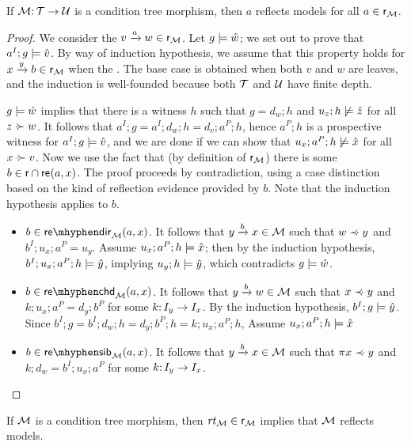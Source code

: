 \begin{lemma}\label{lem:reflection}
If ${\mathcal{M}}{:}\, {\mathcal{T}}\rightarrow {\mathcal{U}}$ is a condition tree morphism, then $a$ reflects models for all $a\in{\mathsf{r}}_{\mathcal{M}}$.
\end{lemma}
%
\begin{proof}
We consider the ${v}\xrightarrow{a}{w}\in {\mathsf{r}}_{\mathcal{M}}$. Let $g\models \hat w$; we set out to prove that $a^I;g\models \hat v$. By way of induction hypothesis, we assume that this property holds for ${x}\xrightarrow{y}{b}\in {\mathsf{r}}_{\mathcal{M}}$ when the . The base case is obtained when both $v$ and $w$ are leaves, and the induction is well-founded because both ${\mathcal{T}}$ and ${\mathcal{U}}$ have finite depth.

$g\models \hat w$ implies that there is a witness $h$ such that $g=d_w;h$ and $u_z;h\not\models \hat z$ for all $z\mathrel{\cdot\mskip-8mu\succ} w$. It follows that $a^I;g=a^I;d_w;h=d_v;a^P;h$, hence $a^P;h$ is a prospective witness for $a^I;g\models \hat v$, and we are done if we can show that $u_x;a^P;h\not\models \hat x$ for all $x\mathrel{\cdot\mskip-8mu\succ} v$. Now we use the fact that (by definition of ${\mathsf{r}}_{\mathcal{M}}$) there is some $b\in {\mathsf{r}} \cap \mathsf{re}_{}(a,x)$. The proof proceeds by contradiction, using a case distinction based on the kind of reflection evidence provided by $b$. Note that the induction hypothesis applies to $b$.
%
\begin{itemize}
\item $b\in \sdir[\cM]{a,x}$. It follows that ${y}\xrightarrow{b}{x}\in{\mathcal{M}}$ such that $w\mathrel{\prec\mskip-8mu\cdot} y$ and $b^I;u_x;a^P=u_y$. Assume $u_x;a^P;h\models \hat x$; then by the induction hypothesis, $b^I;u_x;a^P;h\models \hat y$, implying $u_y;h\models \hat y$, which contradicts $g\models \hat w$.

\item $b\in \schd[\cM]{a,x}$. It follows that ${y}\xrightarrow{b}{w}\in {\mathcal{M}}$ such that $x\mathrel{\prec\mskip-8mu\cdot} y$ and $k;u_x;a^P=d_y;b^P$ for some $k{:}\, I_y\rightarrow I_x$. By the induction hypothesis, $b^I;g\models \hat y$. Since $b^I;g=b^I;d_w;h=d_y;b^P;h= k;u_x;a^P;h$,  Assume $u_x;a^P;h\models \hat x$

\item $b\in \ssib[\cM]{a,x}$. It follows that ${y}\xrightarrow{b}{x}\in {\mathcal{M}}$ such that $\pi{x}\mathrel{\prec\mskip-8mu\cdot} y$ and $k;d_w=b^I;u_x;a^P$ for some $k{:}\, I_y\rightarrow I_x$.
\end{itemize}
\end{proof}

\begin{corollary}
If ${\mathcal{M}}$ is a condition tree morphism, then $\mathit{rt}_{{\mathcal{M}}}\in {\mathsf{r}}_{\mathcal{M}}$ implies that ${\mathcal{M}}$ reflects models.
\end{corollary}

